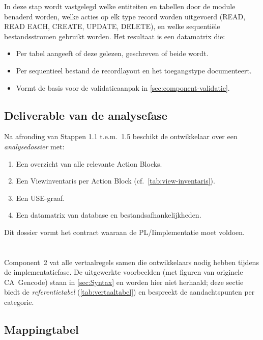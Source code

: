 In deze stap wordt vastgelegd welke entiteiten en tabellen door de module benaderd worden, welke acties op 
elk type record worden uitgevoerd (READ, READ EACH, CREATE, UPDATE, DELETE), en welke sequentiële 
bestandsstromen gebruikt worden. Het resultaat is een datamatrix die:
\begin{itemize}
    \item Per tabel aangeeft of deze gelezen, geschreven of beide wordt.
    \item Per sequentieel bestand de recordlayout en het toegangstype documenteert.
    \item Vormt de basis voor de validatieaanpak in \autoref{sec:component-validatie}.
\end{itemize}

\subsection{Deliverable van de analysefase}
\label{subsec:deliverable-analyse}

Na afronding van Stappen 1.1 t.e.m.\ 1.5 beschikt de ontwikkelaar over een \emph{analysedossier} met:
\begin{enumerate}
    \item Een overzicht van alle relevante Action Blocks.
    \item Een View\-inventaris per Action Block (cf.\ \autoref{tab:view-inventaris}).
    \item Een USE-graaf.
    \item Een datamatrix van database\- en bestandsafhankelijkheden.
\end{enumerate}
Dit dossier vormt het contract waaraan de PL/I\-implementatie moet voldoen.

\section{}%
\label{sec:component-vertaling}

Component~2 vat alle vertaalregels samen die ontwikkelaars nodig hebben tijdens de implementatiefase. De 
uitgewerkte voorbeelden (met figuren van originele CA~Gen\-code) staan in \autoref{sec:Syntax} 
en worden hier niet herhaald; deze sectie biedt de \emph{referentietabel} 
(\autoref{tab:vertaaltabel}) en bespreekt de aandachtspunten per categorie.

\subsection{Mappingtabel}
\label{subsec:mappingtabel}

